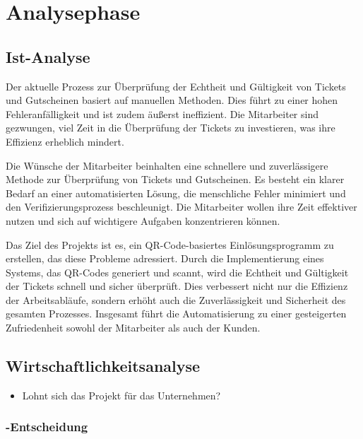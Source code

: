 \section{Analysephase} 
\label{sec:Analysephase}


\subsection{Ist-Analyse} 
\label{sec:IstAnalyse}

Der aktuelle Prozess zur Überprüfung der Echtheit und Gültigkeit von Tickets und Gutscheinen basiert auf manuellen Methoden. Dies führt zu einer hohen Fehleranfälligkeit und ist zudem äußerst ineffizient. Die Mitarbeiter sind gezwungen, viel Zeit in die Überprüfung der Tickets zu investieren, was ihre Effizienz erheblich mindert.

Die Wünsche der Mitarbeiter beinhalten eine schnellere und zuverlässigere Methode zur Überprüfung von Tickets und Gutscheinen. Es besteht ein klarer Bedarf an einer automatisierten Lösung, die menschliche Fehler minimiert und den Verifizierungsprozess beschleunigt. Die Mitarbeiter wollen ihre Zeit effektiver nutzen und sich auf wichtigere Aufgaben konzentrieren können.

Das Ziel des Projekts ist es, ein QR-Code-basiertes Einlösungsprogramm zu erstellen, das diese Probleme adressiert. Durch die Implementierung eines Systems, das QR-Codes generiert und scannt, wird die Echtheit und Gültigkeit der Tickets schnell und sicher überprüft. Dies verbessert nicht nur die Effizienz der Arbeitsabläufe, sondern erhöht auch die Zuverlässigkeit und Sicherheit des gesamten Prozesses. Insgesamt führt die Automatisierung zu einer gesteigerten Zufriedenheit sowohl der Mitarbeiter als auch der Kunden.

\subsection{Wirtschaftlichkeitsanalyse}
\label{sec:Wirtschaftlichkeitsanalyse}
\begin{itemize}
	\item Lohnt sich das Projekt für das Unternehmen?
\end{itemize}


\subsubsection{-Entscheidung}
\label{sec:MakeOrBuyEntscheidung}

